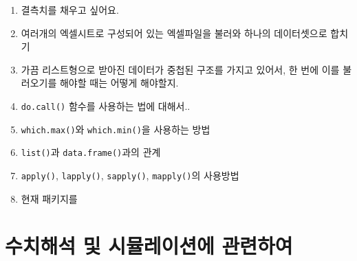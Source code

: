\documentclass{article}
\begin{document}
\begin{enumerate}


\item 결측치를 채우고 싶어요.

\item 여러개의 엑셀시트로 구성되어 있는 엑셀파일을 불러와 하나의 데이터셋으로 합치기

\item 가끔 리스트형으로 받아진 데이터가 중첩된 구조를 가지고 있어서, 한 번에 이를 불러오기를 해야할 때는 어떻게 해야할지.

\item \texttt{do.call()} 함수를 사용하는 법에 대해서..

\item \texttt{which.max()}와 \texttt{which.min()}을 사용하는 방법 

\item \texttt{list()}과 \texttt{data.frame()}과의 관계

\item \texttt{apply()}, \texttt{lapply()}, \texttt{sapply()}, \texttt{mapply()}의 사용방법

\item 현재 패키지를



% 


\end{enumerate}

%
%

\section{수치해석 및 시뮬레이션에 관련하여}
\end{document}
